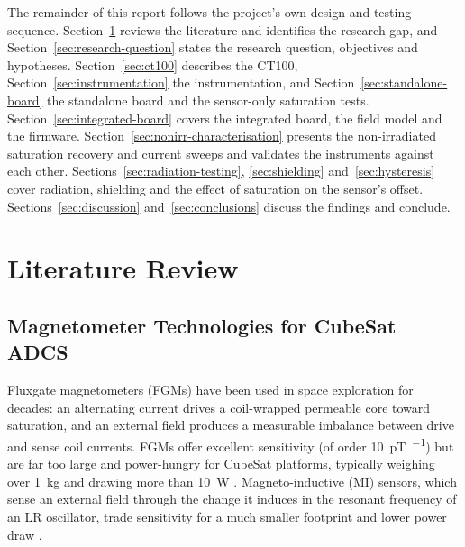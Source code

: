 \documentclass[12pt,a4paper]{article}
\begin{document}
The remainder of this report follows the project's own design and testing sequence. Section~\ref{sec:litreview} reviews the literature and identifies the research gap, and Section~\ref{sec:research-question} states the research question, objectives and hypotheses. Section~\ref{sec:ct100} describes the CT100, Section~\ref{sec:instrumentation} the instrumentation, and Section~\ref{sec:standalone-board} the standalone board and the sensor-only saturation tests. Section~\ref{sec:integrated-board} covers the integrated board, the field model and the firmware. Section~\ref{sec:nonirr-characterisation} presents the non-irradiated saturation recovery and current sweeps and validates the instruments against each other. Sections~\ref{sec:radiation-testing}, \ref{sec:shielding} and~\ref{sec:hysteresis} cover radiation, shielding and the effect of saturation on the sensor's offset. Sections~\ref{sec:discussion} and~\ref{sec:conclusions} discuss the findings and conclude.

\section{Literature Review}
\label{sec:litreview}

\subsection{Magnetometer Technologies for CubeSat ADCS}
\label{sec:magnetometer-tech}

Fluxgate magnetometers (FGMs) have been used in space exploration for decades: an alternating current drives a coil-wrapped permeable core toward saturation, and an external field produces a measurable imbalance between drive and sense coil currents. FGMs offer excellent sensitivity (of order \SI{10}{\pico\tesla\per\sqrt{\hertz}}) but are far too large and power-hungry for CubeSat platforms, typically weighing over \SI{1}{\kilo\gram} and drawing more than \SI{10}{\watt} \cite{survey-magnetic-sensing,bennett2021}. Magneto-inductive (MI) sensors, which sense an external field through the change it induces in the resonant frequency of an LR oscillator, trade sensitivity for a much smaller footprint and lower power draw \cite{survey-magnetic-sensing}.
\end{document}
